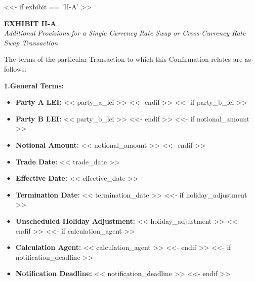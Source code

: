 \documentclass[11pt, a4paper]{article}
\begin{document}

<<- if exhibit == 'II-A' >>
\begin{center}
    \textbf{EXHIBIT II-A} \\
    \textit{Additional Provisions for a Single Currency Rate Swap or Cross-Currency Rate Swap Transaction}
\end{center}

\noindent The terms of the particular Transaction to which this Confirmation relates are as follows:

\vspace{0.3cm}
\noindent \textbf{1.\quad General Terms:}
\begin{itemize}[leftmargin=2cm, label={}, itemsep=3pt]
<<- if party_a_lei >>
    \item \textbf{Party A LEI:} << party_a_lei >>
<<- endif >>
<<- if party_b_lei >>
    \item \textbf{Party B LEI:} << party_b_lei >>
<<- endif >>
<<- if notional_amount >>
    \item \textbf{Notional Amount:} << notional_amount >>
<<- endif >>
    \item \textbf{Trade Date:} << trade_date >>
    \item \textbf{Effective Date:} << effective_date >>
    \item \textbf{Termination Date:} << termination_date >>
<<- if holiday_adjustment >>
    \item \textbf{Unscheduled Holiday Adjustment:} << holiday_adjustment >>
<<- endif >>
<<- if calculation_agent >>
    \item \textbf{Calculation Agent:} << calculation_agent >>
<<- endif >>
<<- if notification_deadline >>
    \item \textbf{Notification Deadline:} << notification_deadline >>
<<- endif >>
\end{itemize}
\end{document}
